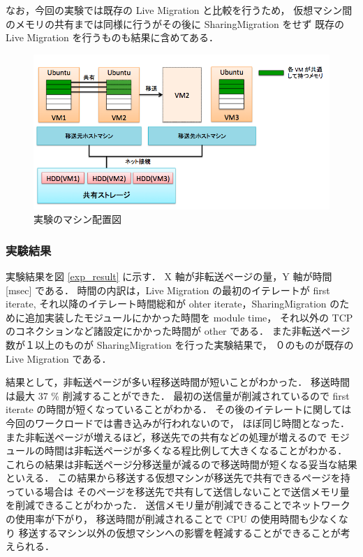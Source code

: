 \documentclass[graduation-thesis]{mlarticle}
\begin{document}
なお，今回の実験では既存の Live Migration と比較を行うため，
仮想マシン間のメモリの共有までは同様に行うがその後に SharingMigration をせず
既存の Live Migration を行うものも結果に含めてある．

\begin{figure}[H]\begin{center}\includegraphics[width=12.0cm]{./img/exp01_arrangement.png}\caption{ 実験のマシン配置図}\label{exp01_arrangement}\end{center}\end{figure}

\subsubsection{実験結果}
\label{sec-6-1-3}
実験結果を図 \ref{exp_result} に示す．
X 軸が非転送ページの量，Y 軸が時間 [msec] である．
時間の内訳は，Live Migration の最初のイテレートが first iterate, それ以降のイテレート時間総和が
ohter iterate，SharingMigration のために追加実装したモジュールにかかった時間を module time，
それ以外の TCP のコネクションなど諸設定にかかった時間が other である．
また非転送ページ数が１以上のものが SharingMigration を行った実験結果で，
０のものが既存の Live Migration である．

結果として，非転送ページが多い程移送時間が短いことがわかった．
移送時間は最大 37 \% 削減することができた．
最初の送信量が削減されているので first iterate の時間が短くなっていることがわかる．
その後のイテレートに関しては今回のワークロードでは書き込みが行われないので，
ほぼ同じ時間となった．また非転送ページが増えるほど，移送先での共有などの処理が増えるので
モジュールの時間は非転送ページが多くなる程比例して大きくなることがわかる．
これらの結果は非転送ページ分移送量が減るので移送時間が短くなる妥当な結果といえる．
この結果から移送する仮想マシンが移送先で共有できるページを持っている場合は
そのページを移送先で共有して送信しないことで送信メモリ量を削減できることがわかった．
送信メモリ量が削減できることでネットワークの使用率が下がり，
移送時間が削減されることで CPU の使用時間も少なくなり
移送するマシン以外の仮想マシンへの影響を軽減することができることが考えられる．
\end{document}
